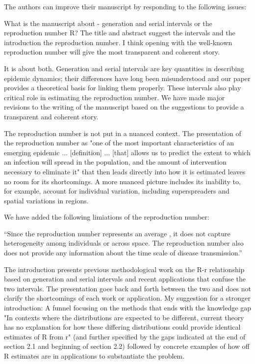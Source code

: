 \documentclass[12pt]{article}
\newcommand{\revtext}{\textsf}
\begin{document}
\revtext{The authors can improve their manuscript by responding to the following issues:}

\revtext{What is the manuscript about - generation and serial intervals or the reproduction number R? The title and abstract suggest the intervals and the introduction the reproduction number. I think opening with the well-known reproduction number will give the most transparent and coherent story.}

It is about both. Generation and serial intervals are key quantities in describing epidemic dynamics; their differences have long been misunderstood and our paper provides a theoretical basis for linking them properly. These intervals also play critical role in estimating the reproduction number. We have made major revisions to the writing of the manuscript based on the suggestions to provide a transparent and coherent story.

\revtext{The reproduction number is not put in a nuanced context. The presentation of the reproduction number as "one of the most important characteristics of an emerging epidemic ... [definition] ... [that] allows us to predict the extent to which an infection will spread in the population, and the amount of intervention necessary to eliminate it" that then leads directly into how it is estimated leaves no room for its shortcomings. A more nuanced picture includes its inability to, for example, account for individual variation, including superspreaders and spatial variations in regions.}

We have added the following limiations of the reproduction number:

``Since the reproduction number represents an average \citep{diekmann1990definition, anderson1991infectious}, it does not capture heterogeneity among individuals or across space.
The reproduction number also does not provide any information about the time scale of disease transmission.''

\revtext{The introduction presents previous methodological work on the R-r relationship based on generation and serial intervals and recent applications that confuse the two intervals. The presentation goes back and forth between the two and does not clarify the shortcomings of each work or application. My suggestion for a stronger introduction: A funnel focusing on the methods that ends with the knowledge gap "In contexts where the distributions are expected to be different, current theory has no explanation for how these differing distributions could provide identical estimates of R from r" (and further specified by the gaps indicated at the end of section 2.1 and beginning of section 2.2) followed by concrete examples of how off R estimates are in applications to substantiate the problem.}
\end{document}
